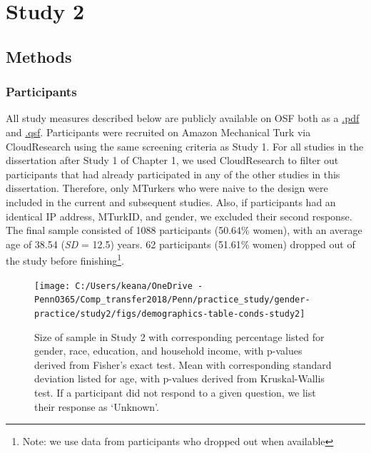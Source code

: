 \documentclass[a4paper, nobind]{templates/ociamthesis}
\begin{document}
\hypertarget{study-2}{%
\section{Study 2}\label{study-2}}

\hypertarget{methods-1}{%
\subsection{Methods}\label{methods-1}}

\hypertarget{participants-1}{%
\subsubsection{Participants}\label{participants-1}}

All study measures described below are publicly available on OSF both as a \href{https://osf.io/9pt2e/}{.pdf} and \href{https://osf.io/bxwu2/}{.qsf}. Participants were recruited on Amazon Mechanical Turk via CloudResearch using the same screening criteria as Study 1. For all studies in the dissertation after Study 1 of Chapter 1, we used CloudResearch to filter out participants that had already participated in any of the other studies in this dissertation. Therefore, only MTurkers who were naive to the design were included in the current and subsequent studies. Also, if participants had an identical IP address, MTurkID, and gender, we excluded their second response. The final sample consisted of 1088 participants (50.64\% women), with an average age of 38.54 (\emph{SD} = 12.5) years. 62 participants (51.61\% women) dropped out of the study before finishing\footnote{Note: we use data from participants who dropped out when available}.

\begin{figure}

{\centering \texttt{[image: C:/Users/keana/OneDrive - PennO365/Comp\_transfer2018/Penn/practice\_study/gender-practice/study2/figs/demographics-table-conds-study2]} 

}

\caption{Size of sample in Study 2 with corresponding percentage listed for gender, race, education, and household income, with p-values derived from Fisher’s exact test. Mean with corresponding standard deviation listed for age, with p-values derived from Kruskal-Wallis test. If a participant did not respond to a given question, we list their response as ‘Unknown’.}\label{fig:demographics-table-study2}
\end{figure}
\end{document}
